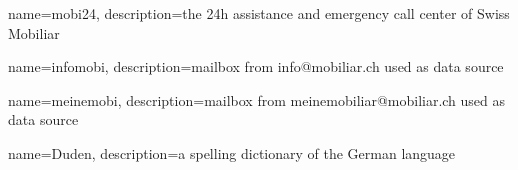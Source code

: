 {
    name=mobi24,
    description={the 24h assistance and emergency call center of Swiss Mobiliar}
}

{
    name=infomobi,
    description={mailbox from info@mobiliar.ch used as data source}
}

{
    name=meinemobi,
    description={mailbox from meinemobiliar@mobiliar.ch used as data source}
}

{
    name=Duden,
    description={a spelling dictionary of the German language}
}








